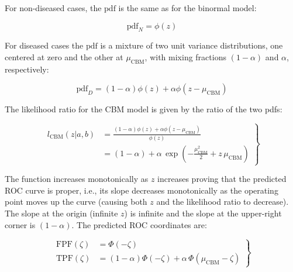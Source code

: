\documentclass[
]{book}
\begin{document}
For non-diseased cases, the \(\text{pdf}\) is the same as for the binormal model:

\begin{equation}
\text{pdf}_N=\phi(z) 
\label{eq:proper-roc-models-cbm-pdfn}
\end{equation}

For diseased cases the \(\text{pdf}\) is a mixture of two unit variance distributions, one centered at zero and the other at \(\mu_\text{CBM}\), with mixing fractions \((1-\alpha)\) and \(\alpha\), respectively:

\begin{equation}
\text{pdf}_D=\left( 1-\alpha \right)\phi(z) + \alpha \phi(z-\mu_\text{CBM})
\label{eq:proper-roc-models-cbm-pdfd}
\end{equation}

The likelihood ratio for the CBM model is given by the ratio of the two pdfs:

\begin{equation}
\left.\begin{aligned}
l_\text{CBM}\left( z|a,b \right)&=\frac{\left( 1-\alpha \right)\phi(z) + \alpha \phi(z-\mu_\text{CBM})}{\phi(z)}\\
&=\left( 1-\alpha \right)+\alpha \, \exp\left(-\frac{\mu_\text{CBM}^2}{2}+z\,\mu_\text{CBM}  \right)
\end{aligned}\right\}
\label{eq:proper-roc-models-cbm-likelihood}
\end{equation}

The function increases monotonically as \(z\) increases proving that the predicted ROC curve is proper, i.e., its slope decreases monotonically as the operating point moves up the curve (causing both \(z\) and the likelihood ratio to decrease). The slope at the origin (infinite \(z\)) is infinite and the slope at the upper-right corner is \((1-\alpha)\). The predicted ROC coordinates are:

\begin{equation}
\left.\begin{aligned}
\text{FPF}\left( \zeta \right) &= \Phi\left( -\zeta \right)\\
\text{TPF}\left( \zeta \right) &= \left( 1-\alpha \right)\Phi\left( -\zeta \right)+\alpha \,\Phi\left( \mu_\text{CBM}-\zeta \right)
\end{aligned}\right\}
\label{eq:proper-roc-models-cbm-fpf-tpf}
\end{equation}
\end{document}
